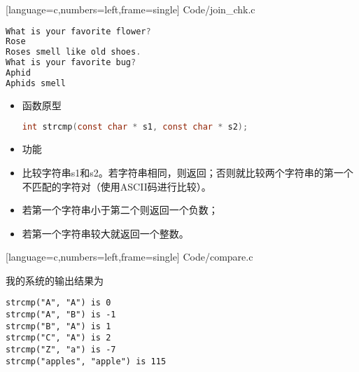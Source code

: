 \begin{frame}
  
  [language=c,numbers=left,frame=single]
  {Code/join_chk.c}
\end{frame}


\begin{frame}[fragile]
\begin{lstlisting}[language=c]
What is your favorite flower?
Rose
Roses smell like old shoes.
What is your favorite bug?
Aphid
Aphids smell
\end{lstlisting}

\end{frame}

\begin{frame}[fragile] 
  \begin{itemize}
  \item \textcolor{acolor1}{函数原型}
    \begin{lstlisting}[language=c,backgroundcolor=\color{red!20}]
   int strcmp(const char * s1, const char * s2);
    \end{lstlisting}
  \item
    \textcolor{acolor1}{功能}
  \item[]
    比较字符串{\tf s1}和{\tf s2}。若字符串相同，则返回{}；否则就比较两个字符串的第一个不匹配的字符对（使用ASCII码进行比较）。
  \end{itemize}
\end{frame}

\begin{frame}[fragile] 
  \begin{itemize}
  \item
    若第一个字符串小于第二个则返回一个负数；
  \item
    若第一个字符串较大就返回一个整数。
  \end{itemize}
\end{frame}

\begin{frame}

[language=c,numbers=left,frame=single]
{Code/compare.c}
\end{frame}


\begin{frame}[fragile]
我的系统的输出结果为
\begin{lstlisting}[backgroundcolor=\color{red!20}]  
strcmp("A", "A") is 0
strcmp("A", "B") is -1
strcmp("B", "A") is 1
strcmp("C", "A") is 2
strcmp("Z", "a") is -7
strcmp("apples", "apple") is 115
\end{lstlisting}
\end{frame}



